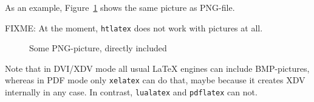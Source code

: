 As an example, Figure~\ref{fig:asIsPng} shows the same picture 
as PNG-file. 

FIXME\@: At the moment, \texttt{htlatex} does not work with pictures at all. 

\begin{figure}[htb]
\centering
{}
\caption{\label{fig:asIsPng}Some PNG-picture, directly included }
\end{figure}

Note that in DVI/XDV mode all usual \LaTeX{} engines 
can include BMP-pictures, whereas in PDF mode only \texttt{xelatex} 
can do that, maybe because it creates XDV internally in any case. 
In contrast, \texttt{lualatex} and \texttt{pdflatex} can not. 

  
